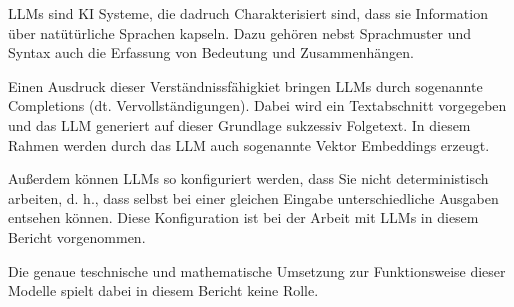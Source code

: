 \documentclass[../main.tex]{subfiles}
\begin{document}
\glspl{LLM} sind KI Systeme, die dadruch Charakterisiert sind, dass sie Information über natütürliche Sprachen kapseln.
Dazu gehören nebst Sprachmuster und Syntax auch die Erfassung von Bedeutung und Zusammenhängen.
\cite{zheng2023large}

Einen Ausdruck dieser Verständnissfähigkiet bringen \glspl{LLM} durch sogenannte Completions (dt. Vervollständigungen).
Dabei wird ein Textabschnitt vorgegeben und das \gls{LLM} generiert auf dieser Grundlage sukzessiv Folgetext.
In diesem Rahmen werden durch das \gls{LLM} auch sogenannte Vektor Embeddings erzeugt.
\cite{naveed2023comprehensive}

Außerdem können \glspl{LLM} so konfiguriert werden, dass Sie nicht deterministisch arbeiten, d. h., dass selbst bei einer gleichen Eingabe unterschiedliche Ausgaben entsehen können.
Diese Konfiguration ist bei der Arbeit mit \glspl{LLM} in diesem Bericht vorgenommen.

Die genaue teschnische und mathematische Umsetzung zur Funktionsweise dieser Modelle spielt dabei in diesem Bericht keine Rolle.
\end{document}
